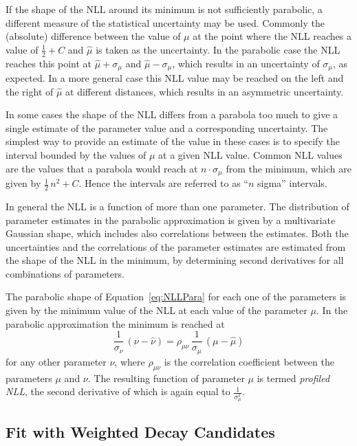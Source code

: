 If the shape of the NLL around its minimum is not sufficiently parabolic, a different measure of the statistical uncertainty may be used.
Commonly the (absolute) difference between the value of $\mu$ at the point where the NLL reaches a value of $\tfrac{1}{2}+C$ and
$\hat{\mu}$ is taken as the uncertainty. In the parabolic case the NLL reaches this point at $\hat{\mu}+\sigma_\mu$ and
$\hat{\mu}-\sigma_\mu$, which results in an uncertainty of $\sigma_\mu$, as expected. In a more general case this NLL value may be reached
on the left and the right of $\hat{\mu}$ at different distances, which results in an asymmetric uncertainty.

In some cases the shape of the NLL differs from a parabola too much to give a single estimate of the parameter value and a corresponding
uncertainty. The simplest way to provide an estimate of the value in these cases is to specify the interval bounded by the values of $\mu$
at a given NLL value. Common NLL values are the values that a parabola would reach at $n\cdot\sigma_\mu$ from the minimum, which are given
by $\tfrac{1}{2}\,n^2+C$. Hence the intervals are referred to as ``$n$ sigma'' intervals.

In general the NLL is a function of more than one parameter. The distribution of parameter estimates in the parabolic approximation is
given by a multivariate Gaussian shape, which includes also correlations between the estimates. Both the uncertainties and the correlations
of the parameter estimates are estimated from the shape of the NLL in the minimum, by determining second derivatives for all combinations
of parameters.

The parabolic shape of Equation~\ref{eq:NLLPara} for each one of the parameters is given by the minimum value of the NLL at each value of
the parameter $\mu$. In the parabolic approximation the minimum is reached at
\begin{equation}
  \frac{1}{\sigma_\nu}\, (\nu-\hat{\nu})  = \rho_{\mu\nu}\, \frac{1}{\sigma_\mu}\, (\mu-\hat{\mu})
\end{equation}
for any other parameter $\nu$, where $\rho_{\mu\nu}$ is the correlation coefficient between the parameters $\mu$ and $\nu$. The resulting
function of parameter $\mu$ is termed \emph{profiled NLL}, the second derivative of which is again equal to $\frac{1}{\sigma_\mu^2}$.


\subsection{Fit with Weighted Decay Candidates}
\label{subsec:ana_fit_weights}

